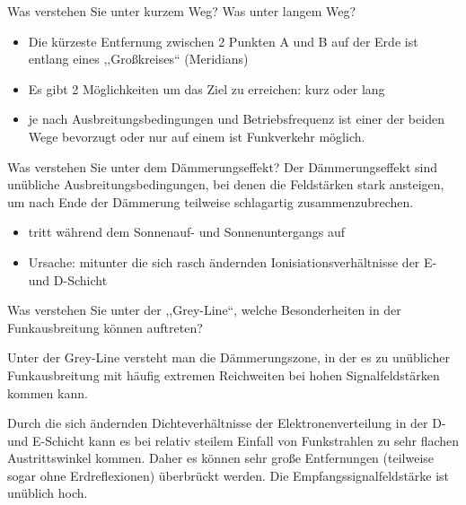 \documentclass[avery5371,grid,frame,a4paper]{flashcards}
\newcommand{\card}[3]{
  \begin{flashcard}[{\chap} -- #1]{#2}#3\end{flashcard}
}
\begin{document}
\card{18}{Was verstehen Sie unter kurzem Weg? Was unter langem Weg?}{
  \begin{itemize}
    \item Die kürzeste Entfernung zwischen 2 Punkten A und B auf der Erde ist entlang eines ,,Großkreises`` (Meridians)
    \item Es gibt 2 Möglichkeiten um das Ziel zu erreichen:  kurz oder lang
    \item je nach Ausbreitungsbedingungen und Betriebsfrequenz ist einer der beiden Wege bevorzugt oder nur auf einem ist Funkverkehr möglich.
  \end{itemize}
}
\card{19}{Was verstehen Sie unter dem Dämmerungseffekt?}{
  Der Dämmerungseffekt sind unübliche Ausbreitungsbedingungen, bei denen die Feldstärken stark ansteigen, um nach Ende der Dämmerung teilweise schlagartig zusammenzubrechen.
  \begin{itemize}
    \item tritt während dem Sonnenauf- und Sonnenuntergangs auf
    \item Ursache: mitunter die sich rasch ändernden Ionisiationsverhältnisse der E- und D-Schicht
  \end{itemize}
}
\card{20}{Was verstehen Sie unter der ,,Grey-Line``, welche Besonderheiten in der Funkausbreitung können auftreten?}{
  \small
  \item
  Unter der Grey-Line versteht man die Dämmerungszone, in der es zu unüblicher Funkausbreitung mit häufig extremen Reichweiten bei hohen Signalfeldstärken kommen kann.

  \item
  Durch die sich ändernden Dichteverhältnisse der Elektronenverteilung in der D- und E-Schicht kann es bei relativ steilem Einfall von Funkstrahlen zu sehr flachen Austrittswinkel kommen. Daher es können sehr große Entfernungen (teilweise sogar ohne Erdreflexionen) überbrückt werden. Die Empfangssignalfeldstärke ist unüblich hoch.
}
\end{document}
